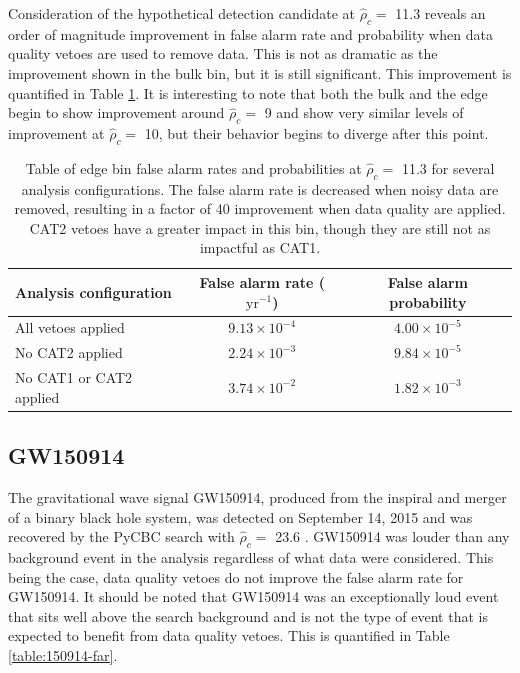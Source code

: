 Consideration of the hypothetical detection candidate at $\hat{\rho}_{c} =$ 11.3 reveals an
order of magnitude improvement
in false alarm rate and probability when data quality vetoes are used to remove data.
This is not as dramatic as
the improvement shown in the bulk bin, but it is still significant. This improvement is
quantified in Table \ref{table:edge-far}. It is interesting to note
that both the bulk and the edge begin to show improvement around $\hat{\rho}_{c} =$ 9 and
show very similar levels
of improvement at $\hat{\rho}_{c} =$ 10, but their behavior begins to diverge after this point.

\begin{table}[!ht]%
  \begin{center}
    \begin{tabular}{lcc}
      \hline
      Analysis configuration & False alarm rate ($\mathrm{yr}^{-1}$) & False alarm probability \\ \hline
      All vetoes applied & $9.13\times10^{-4}$ & $4.00\times10^{-5}$ \\
      No CAT2 applied & $2.24\times10^{-3}$ & $9.84\times10^{-5}$ \\
      No CAT1 or CAT2 applied & $3.74\times10^{-2}$ & $1.82\times10^{-3}$ \\
      \hline
    \end{tabular}
  \end{center}
  \caption[Edge bin FAR - GW150914 analysis]{Table of edge bin false alarm rates and probabilities at $\hat{\rho}_{c} =$ 11.3 %
           for several analysis configurations. %
           The false alarm rate is decreased when noisy data are removed, %
           resulting in a factor of 40 improvement when data quality are applied. CAT2 vetoes have a %
           greater impact in this bin, though they are still not as impactful as CAT1.}
  \label{table:edge-far}
\end{table}

\subsection{GW150914}

The gravitational wave signal GW150914, produced from the inspiral and merger of a binary black
hole system, was detected on September 14, 2015 and was recovered by the PyCBC search with
$\hat{\rho}_{c} =$ 23.6 \cite{GW150914-DETECTION}.
GW150914 was louder than
any background event in the analysis regardless of what data were considered. This being
the case, data quality vetoes do not improve the false alarm rate for GW150914. It should be
noted that GW150914 was an exceptionally loud event that sits well above the search background
and is not the type of event that is expected to benefit from data quality vetoes.
This is quantified in Table \ref{table:150914-far}.

